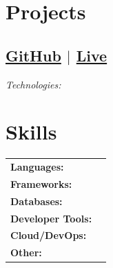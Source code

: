 \documentclass[10pt, a4paper]{article}
\newcommand{\subtext}[1]{
#1\par\vspace{-0.2cm}}
\newcommand{\hskills}[1]{{\bfseries #1} }
\begin{document}

\subsection*{ \hfill {\normalsize \normalfont }}
\subtext{ \hfill }
    \begin{itemize}[itemsep=0pt, parsep=1pt, leftmargin=1em]
        
    \end{itemize}
    \vspace{-0.3cm}




\section{Projects}

\subsection*{ \hfill  \href{}{GitHub}  $|$ \href{}{Live}}
\subtext{\small\textit{Technologies: {}}}
    \begin{itemize}[itemsep=0pt, parsep=1pt, leftmargin=1em]
        
    \end{itemize}
    \vspace{-0.25cm}




\section{Skills}

\begin{tabularx}{\textwidth}{@{}l X@{}}
 \hskills{Languages:} &  \\[1pt] 
 \hskills{Frameworks:} &  \\[1pt] 
 \hskills{Databases:} &  \\[1pt] 
 \hskills{Developer Tools:} &  \\[1pt] 
 \hskills{Cloud/DevOps:} &  \\[1pt] 
 \hskills{Other:} &  \\ 
\end{tabularx}
\vspace{-0.15cm}

\end{document}
